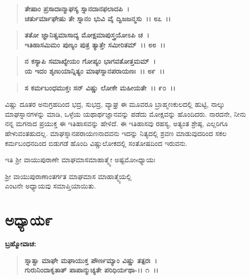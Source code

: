 \begin{verse}
\textbf{ತೇಷಾಂ ಪ್ರಸಾದಾನ್ಮಾಘಸ್ಯ ಸ್ನಾನದಾನಫಲಾದಪಿ~।}\\\textbf{ಚರ್ತುರ್ಮಾಘೇಷು ತೇ ಸ್ನಾನಂ ಭುವಿ ವೈ ದ್ವಿಜಜನ್ಮಸು~।। ೮೭~।। }
\end{verse}

\begin{verse}
\textbf{ತತೋ ಜ್ಞಾನಿತ್ವಮಾಸಾದ್ಯ ಮೋಕ್ಷಮಾಪುಸ್ತ್ರಯೋಽಪಿ ಚ~।}\\\textbf{ಇತಿಹಾಸಮಿಮಂ ಪುಣ್ಯಂ ಪುತ್ರ ತ್ಯಾತ್ತೇ ಸಮೀರಿತಮ್~।। ೮೮~।। }
\end{verse}

\begin{verse}
\textbf{ನ ಕಸ್ಯಾಪಿ ಸಮಾಖ್ಯೇಯಂ ಗೋಪ್ಯಂ ಭಾಗವತೋತ್ತಮಮ್~।}\\\textbf{ಯ ಇದಂ ಶೃಣುಯಾನ್ನಿತ್ಯಂ ಮಾಘಸ್ನಾನಪರಾಯಣಃ~।। ೮೯~।। }
\end{verse}

\begin{verse}
\textbf{ಸ ಕರ್ಮಬಂಧಮುಕ್ತಃ ಸನ್ ವಿಷ್ಣು ಲೋಕೇ ಮಹೀಯತೇ~।। ೯೦~।।}
\end{verse}

ವಿಷ್ಣು ದೂತರ ಅನುಗ್ರಹದಿಂದ ಭದ್ರ, ಸುಭದ್ರ, ವ್ಯಾಘ್ರ ಈ ಮೂವರೂ ಬ್ರಾಹ್ಮಣಕುಲದಲ್ಲಿ ಹುಟ್ಟಿ, ನಾಲ್ಕು ಮಾಘಸ್ನಾನಗಳನ್ನು ಮಾಡಿ, ಒಳ್ಳೆಯ ಯಥಾರ್ಥಜ್ಞಾನವನ್ನು ಪಡೆದು ಮೋಕ್ಷವನ್ನು ಹೊಂದಿದರು. ನಾರದನೇ, ನೀನು ನನ್ನ ಮಗನಾದ ಪ್ರಯುಕ್ತ ಈ ಇತಿಹಾಸವನ್ನು ಹೇಳಿದೆ. ಈ ಇತಿಹಾಸವು ರಹಸ್ಯ, ಅತ್ಯಂತ ಶ್ರೇಷ್ಠ, ಎಲ್ಲರಿಗೂ ಹೇಳುವಂತಹುದಲ್ಲ. ಮಾಘಸ್ನಾನಪರಾಯಣನಾದವನು ಇದನ್ನು ನಿತ್ಯದಲ್ಲಿ ಶ್ರವಣ ಮಾಡುವುದರಿಂದ ಸಕಲ ಕರ್ಮಬಂಧನದಿಂದ ಬಿಡುಗಡೆ ಹೊಂದಿ ವಿಷ್ಣುಲೋಕದಲ್ಲಿ ಸಂತೋಷದಿಂದ ಇರುವನು.

\begin{center}
ಇತಿ ಶ‍್ರೀ ವಾಯುಪುರಾಣೇ ಮಾಘಮಾಸಮಾಹಾತ್ಮ್ಯೇ ಅಷ್ಟಮೋsಧ್ಯಾಯಃ
\end{center}

\begin{center}
 ಶ‍್ರೀ ವಾಯುಪುರಾಣಾಂತರ್ಗತ ಮಾಘಮಾಸ ಮಾಹಾತ್ಮ್ಯೆಯಲ್ಲಿ \\ ಎಂಟನೇ ಅಧ್ಯಾಯವು ಸಮಾಪ್ತಿಯಾಯಿತು.
\end{center}

\newpage

\section*{ಅಧ್ಯಾಯ\enginline{-}೯}

\emptypage

\begin{flushleft}
\textbf{ಬ್ರಹ್ಮೋವಾಚ:\enginline{-} }
\end{flushleft}

\begin{verse}
\textbf{ಸ್ನಾತ್ವಾ ಮಾಘೇ ಮಘಾಯುಕ್ತ ಪೌರ್ಣಮ್ಯಾಂ ವಿಷ್ಣು ತತ್ಪರಃ~।}\\\textbf{ಗುರುನಿಂದಾಕೃತಾತ್ ಪಾಪಾನ್ಮುಚ್ಯತೇ ಪರಿಧಿರ್ಯಥಾ-।। ೧~।।}
\end{verse}

